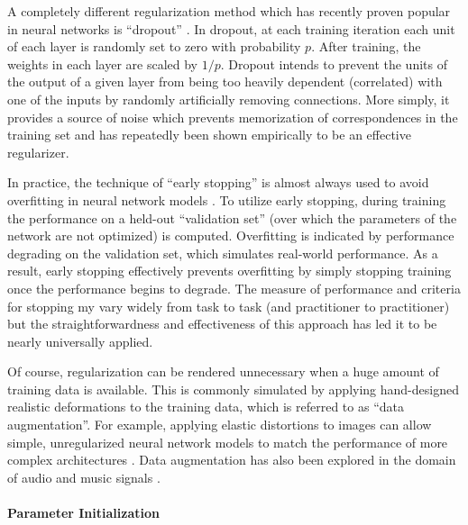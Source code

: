 A completely different regularization method which has recently proven popular in neural networks is ``dropout'' \cite{hinton2012improving}.
In dropout, at each training iteration each unit of each layer is randomly set to zero with probability $p$.
After training, the weights in each layer are scaled by $1/p$.
Dropout intends to prevent the units of the output of a given layer from being too heavily dependent (correlated) with one of the inputs by randomly artificially removing connections.
More simply, it provides a source of noise which prevents memorization of correspondences in the training set and has repeatedly been shown empirically to be an effective regularizer.

In practice, the technique of ``early stopping'' is almost always used to avoid overfitting in neural network models \cite{prechelt2012early}.
To utilize early stopping, during training the performance on a held-out ``validation set'' (over which the parameters of the network are not optimized) is computed.
Overfitting is indicated by performance degrading on the validation set, which simulates real-world performance.
As a result, early stopping effectively prevents overfitting by simply stopping training once the performance begins to degrade.
The measure of performance and criteria for stopping my vary widely from task to task (and practitioner to practitioner) but the straightforwardness and effectiveness of this approach has led it to be nearly universally applied.

Of course, regularization can be rendered unnecessary when a huge amount of training data is available.
This is commonly simulated by applying hand-designed realistic deformations to the training data, which is referred to as ``data augmentation''.
For example, applying elastic distortions to images can allow simple, unregularized neural network models to match the performance of more complex architectures \cite{ciresan2010deep}.
Data augmentation has also been explored in the domain of audio and music signals \cite{mcfee2015software,schluter2015exploring}.

\paragraph{Parameter Initialization}


